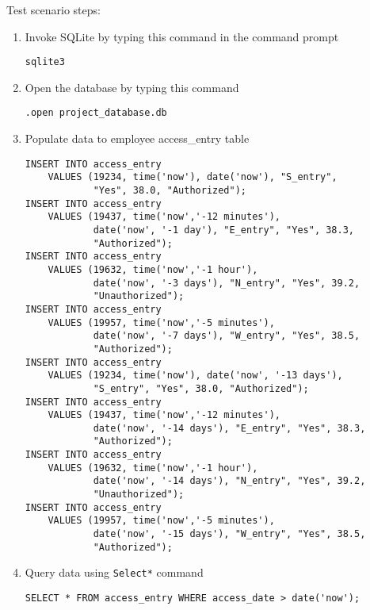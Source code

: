 \noindent
Test scenario steps:
\begin{enumerate}
    \item Invoke SQLite by typing this command in the command prompt
\begin{listing}[H]
\begin{verbatim}
sqlite3
\end{verbatim}
\end{listing}
    \item Open the database by typing this command
\begin{listing}[H]
\begin{verbatim}
.open project_database.db
\end{verbatim}
\end{listing}
    \item Populate data to employee access\_entry table
\begin{listing}[H]
\begin{verbatim}
INSERT INTO access_entry
    VALUES (19234, time('now'), date('now'), "S_entry",
            "Yes", 38.0, "Authorized");
INSERT INTO access_entry
    VALUES (19437, time('now','-12 minutes'),
            date('now', '-1 day'), "E_entry", "Yes", 38.3,
            "Authorized");
INSERT INTO access_entry
    VALUES (19632, time('now','-1 hour'),
            date('now', '-3 days'), "N_entry", "Yes", 39.2,
            "Unauthorized");
INSERT INTO access_entry
    VALUES (19957, time('now','-5 minutes'),
            date('now', '-7 days'), "W_entry", "Yes", 38.5,
            "Authorized");
INSERT INTO access_entry
    VALUES (19234, time('now'), date('now', '-13 days'),
            "S_entry", "Yes", 38.0, "Authorized");
INSERT INTO access_entry
    VALUES (19437, time('now','-12 minutes'),
            date('now', '-14 days'), "E_entry", "Yes", 38.3,
            "Authorized");
INSERT INTO access_entry
    VALUES (19632, time('now','-1 hour'),
            date('now', '-14 days'), "N_entry", "Yes", 39.2,
            "Unauthorized");
INSERT INTO access_entry
    VALUES (19957, time('now','-5 minutes'),
            date('now', '-15 days'), "W_entry", "Yes", 38.5,
            "Authorized");
\end{verbatim}
\end{listing}
    \item Query data using \lstinline{Select*} command
\begin{listing}[H]
\begin{verbatim}
SELECT * FROM access_entry WHERE access_date > date('now');
\end{verbatim}
\end{listing}
\end{enumerate}

